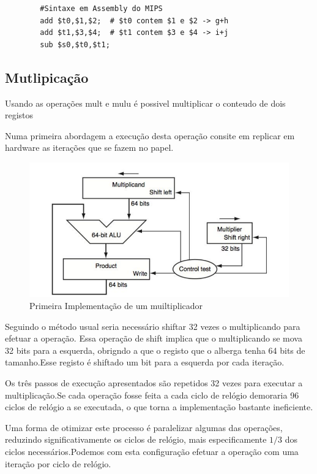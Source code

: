 \documentclass[10pt,a4paper]{book}
\begin{document}
	     \begin{lstlisting}
		#Sintaxe em Assembly do MIPS
		add $t0,$1,$2;  # $t0 contem $1 e $2 -> g+h
		add $t1,$3,$4;  # $t1 contem $3 e $4 -> i+j
		sub $s0,$t0,$t1;

	     \end{lstlisting}

	     \subsection{Mutlipicação}

	     Usando as operações mult e mulu é possivel multiplicar o conteudo de dois registos

	     Numa primeira abordagem a execução desta operação consite em replicar em hardware as iterações que se fazem no papel.

   			\begin{figure}[htp]
			    \centering
			    \includegraphics[scale=0.5]{mul1.png}
			    \caption{Primeira Implementação de um muiltiplicador}
			    \label{mul1}
			\end{figure}

		Seguindo o método usual seria necessário shiftar 32 vezes o multiplicando para efetuar a operação. Essa operação de shift implica que o multiplicando se mova 32 bits para a esquerda, obrigndo a que o registo que o alberga tenha 64 bits de tamanho.Esse registo é shiftado um bit para a esquerda por cada iteração.

		Os três passos de execução apresentados são repetidos 32 vezes para executar a multiplicação.Se cada operação fosse feita a cada ciclo de relógio demoraria 96 ciclos de relógio a se executada, o que torna a implementação bastante ineficiente.

		Uma forma de otimizar este processo é paralelizar algumas das operações, reduzindo significativamente os ciclos de relógio, mais especificamente $1/3$ dos ciclos necessários.Podemos com esta configuração efetuar a operação com uma iteração por ciclo de relógio.
\end{document}
